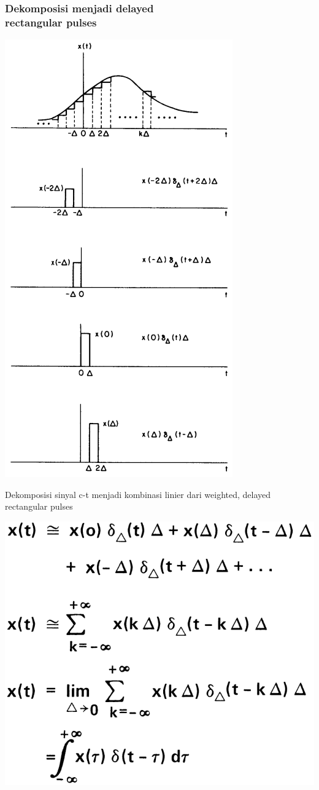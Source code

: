\documentclass[pdflatex,compress,mathserif]{beamer}
\begin{document}
\begin{frame}
	\frametitle{Dekomposisi menjadi delayed\\rectangular pulses}
	\begin{multicols}{2}
		\begin{center}
			\includegraphics[height=0.9\textheight]{img/img03}
		\end{center}
		\columnbreak
		\vfill\null
		Dekomposisi sinyal c-t menjadi kombinasi linier dari weighted, delayed rectangular pulses
		\begin{center}
			\includegraphics[width=0.9\linewidth]{img/img04}

\end{center}
\end{multicols}
\end{frame}
\end{document}
